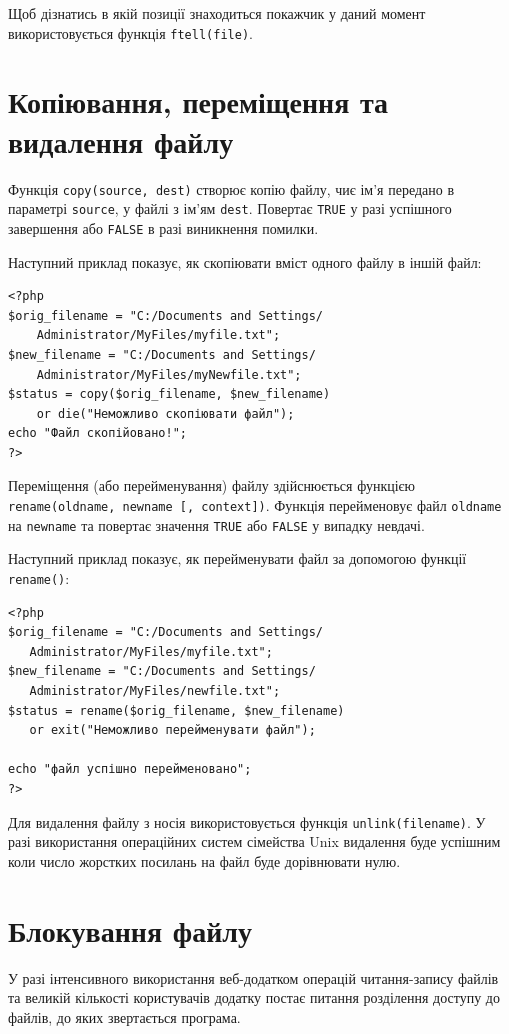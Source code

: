 Щоб дізнатись в якій позиції знаходиться покажчик у даний момент використовується функція \verb'ftell(file)'.
\section{Копіювання, переміщення та видалення файлу}

Функція \verb'copy(source, dest)' створює копію файлу, чиє ім'я передано в параметрі \verb'source', у файлі з ім'ям \verb'dest'. Повертає \verb'TRUE' у разі успішного завершення або \verb'FALSE' в разі виникнення помилки.

Наступний приклад показує, як скопіювати вміст одного файлу в іншій файл:


\begin{lstlisting}[caption=Копіювання змісту файлу]
<?php
$orig_filename = "C:/Documents and Settings/
	Administrator/MyFiles/myfile.txt";
$new_filename = "C:/Documents and Settings/
	Administrator/MyFiles/myNewfile.txt";
$status = copy($orig_filename, $new_filename) 
	or die("Неможливо скопіювати файл");
echo "Файл скопійовано!";
?>
\end{lstlisting}




Переміщення (або перейменування) файлу здійснюється функцією \verb'rename(oldname, newname [, context])'. Функція перейменовує файл \verb'oldname' на \verb'newname' та повертає значення \verb'TRUE' або \verb'FALSE' у випадку невдачі.

Наступний приклад показує, як перейменувати файл за допомогою функції \verb'rename()':



\begin{lstlisting}[caption=Перейменування файлу]
<?php
$orig_filename = "C:/Documents and Settings/
   Administrator/MyFiles/myfile.txt";
$new_filename = "C:/Documents and Settings/
   Administrator/MyFiles/newfile.txt";
$status = rename($orig_filename, $new_filename) 
   or exit("Неможливо перейменувати файл");

echo "файл успішно перейменовано";
?> 
\end{lstlisting}

Для видалення файлу з носія використовується функція \verb'unlink(filename)'. У разі використання операційних систем сімейства Unix видалення буде успішним коли число жорстких посилань на файл буде дорівнювати нулю.

\section{Блокування файлу}
У разі інтенсивного використання веб-додатком операцій читання-запису файлів та великій кількості користувачів додатку постає питання розділення доступу до файлів, до яких звертається програма.

